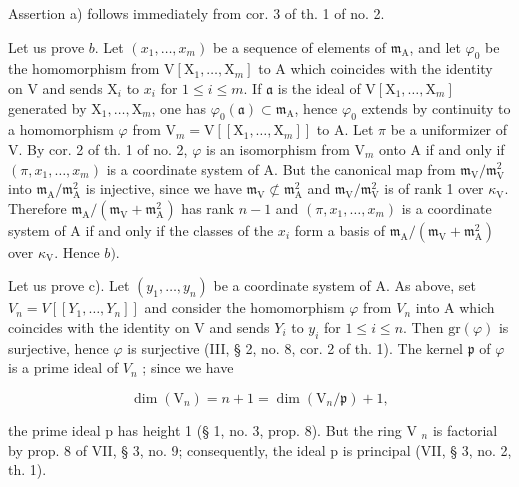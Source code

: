 Assertion a) follows immediately from cor. 3 of th. 1 of no. 2.

Let us prove \(b\). Let \((x_{1},\ldots,x_{m})\) be a sequence of elements of \(\mathfrak{m}_{\mathrm{A}}\), and let \(\varphi_{0}\) be the homomorphism from \(\mathrm{V}[\mathrm{X}_{1},\ldots,\mathrm{X}_{m}]\) to A which coincides with the identity on V and sends \(\mathrm{X}_{i}\) to \(x_{i}\) for \(1\leqslant i\leqslant m\). If \(\mathfrak{a}\) is the ideal of \(\mathrm{V}[\mathrm{X}_{1},\ldots,\mathrm{X}_{m}]\) generated by \(\mathrm{X}_{1},\ldots,\mathrm{X}_{m}\), one has \(\varphi_{0}(\mathfrak{a})\subset\mathfrak{m}_{\mathrm{A}}\), hence \(\varphi_{0}\) extends by continuity to a homomorphism \(\varphi\) from \(\mathrm{V}_{m}=\mathrm{V}[[\mathrm{X}_{1},\ldots,\mathrm{X}_{m}]]\) to A. Let \(\pi\) be a uniformizer of V. By cor. 2 of th. 1 of no. 2, \(\varphi\) is an isomorphism from \(\mathrm{V}_{m}\) onto A if and only if \((\pi,x_{1},\ldots,x_{m})\) is a coordinate system of A. But the canonical map from \(\mathfrak{m}_{\mathrm{V}}/\mathfrak{m}_{\mathrm{V}}^{2}\) into \(\mathfrak{m}_{\mathrm{A}}/\mathfrak{m}_{\mathrm{A}}^{2}\) is injective, since we have \(\mathfrak{m}_{\mathrm{V}}\not\subset\mathfrak{m}_{\mathrm{A}}^{2}\) and \(\mathfrak{m}_{\mathrm{V}}/\mathfrak{m}_{\mathrm{V}}^{2}\) is of rank 1 over \(\kappa_{\mathrm{V}}\). Therefore \(\mathfrak{m}_{\mathrm{A}}/(\mathfrak{m}_{\mathrm{V}}+\mathfrak{m}_{\mathrm{A}}^{2})\) has rank \(n-1\) and \((\pi,x_{1},\ldots,x_{m})\) is a coordinate system of A if and only if the classes of the \(x_{i}\) form a basis of \(\mathfrak{m}_{\mathrm{A}}/(\mathfrak{m}_{\mathrm{V}}+\mathfrak{m}_{\mathrm{A}}^{2})\) over \(\kappa_{\mathrm{V}}\). Hence \(b)\).

Let us prove c). Let \((y_{1}, \ldots, y_{n})\) be a coordinate system of A. As above, set \(V_{n} = V[[Y_{1}, \ldots, Y_{n}]]\) and consider the homomorphism \(\varphi\) from \(V_{n}\) into A which coincides with the identity on V and sends \(Y_{i}\) to \(y_{i}\) for \(1 \leqslant i \leqslant n\). Then \(\text{gr}(\varphi)\) is surjective, hence \(\varphi\) is surjective (III, § 2, no. 8, cor. 2 of th. 1). The kernel \(\mathfrak{p}\) of \(\varphi\) is a prime ideal of \(V_{n}\) ; since we have

\[
\dim (\mathrm{V} _ {n}) = n + 1 = \dim (\mathrm{V} _ {n} / \mathfrak {p}) + 1,
\]

the prime ideal p has height 1 (§ 1, no. 3, prop. 8). But the ring V \(_{n}\) is factorial by prop. 8 of VII, § 3, no. 9; consequently, the ideal p is principal (VII, § 3, no. 2, th. 1).

